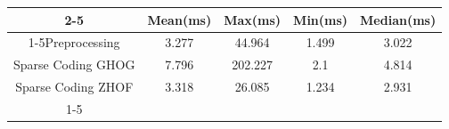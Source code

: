 \documentclass{standalone}
\begin{document}
 
 \begin{tabular}{|c |c |c |c |c |}
\cline{2-5}\cline{2-5} \multicolumn{1}{c |}{ } & Mean(ms) & Max(ms) & Min(ms) & Median(ms)\\ 
\cline{1-5}Preprocessing & 3.277 & 44.964 & 1.499 & 3.022\\ 
 \hhline{|=|=|=|=|=|}Sparse Coding GHOG & 7.796 & 202.227 & 2.1 & 4.814\\ 
 \hhline{|=|=|=|=|=|}Sparse Coding ZHOF & 3.318 & 26.085 & 1.234 & 2.931\\ 
 \cline{1-5}\hline \end{tabular}
 
\end{document}
